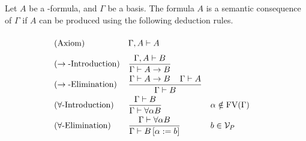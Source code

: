 \begin{definition}
Let $A$ be a \SysP-formula, and $\Gamma$ be a basis. The formula $A$ is a semantic consequence of $\Gamma$ if $A$ can be produced using the following deduction rules.
\begin{mdframed}
	\begingroup%
	\addtolength{\jot}{0.3cm}
	\begin{align*}
		&(\text{Axiom}) &&\Gamma,A\PModels A\vphantom{\frac{\Gamma}{\Gamma}}\\
		&(\rightarrow\text{-Introduction}) &&\frac{\Gamma,A\PModels B}{\Gamma\PModels A\to B}\\
		&(\rightarrow\text{-Elimination}) &&\frac{\Gamma\PModels A\to B \hspace{0.4cm}\Gamma\PModels A}{\Gamma\PModels B}\\
		  & (\forall\text{-Introduction}) &   & \frac{\Gamma\PModels B}{\Gamma\PModels \forall\alpha B} &   & \alpha\notin\FV(\Gamma) \\
		&(\forall\text{-Elimination}) &&\frac{\Gamma\PModels \forall\alpha B }{\Gamma\PModels B\left[ \alpha:=b\right] }
		&& b\in\VarP %
	\end{align*}
	\endgroup
\end{mdframed}
\end{definition}

